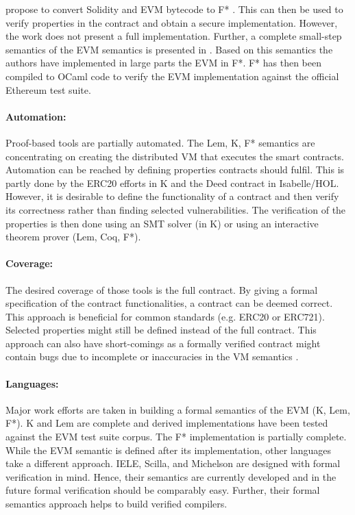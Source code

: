 \citeauthor{Bhargavan2016} propose to convert Solidity and EVM bytecode to F* \cite{Bhargavan2016}. This can then be used to verify properties in the contract and obtain a secure implementation. However, the work does not present a full implementation.
Further, a complete small-step semantics of the EVM semantics is presented in \cite{Grishchenko2018}. Based on this semantics the authors have implemented in large parts the EVM in F*. F* has then been compiled to OCaml code to verify the EVM implementation against the official Ethereum test suite.

\paragraph{Automation:} Proof-based tools are partially automated. The Lem, K, F* semantics are concentrating on creating the distributed VM that executes the smart contracts. Automation can be reached by defining properties contracts should fulfil. This is partly done by the ERC20 efforts in K and the Deed contract in Isabelle/HOL. However, it is desirable to define the functionality of a contract and then verify its correctness rather than finding selected vulnerabilities. The verification of the properties is then done using an SMT solver (in K) or using an interactive theorem prover (Lem, Coq, F*).

\paragraph{Coverage:} The desired coverage of those tools is the full contract. By giving a formal specification of the contract functionalities, a contract can be deemed correct. This approach is beneficial for common standards (e.g. ERC20 or ERC721). Selected properties might still be defined instead of the full contract. This approach can also have short-comings as a formally verified contract might contain bugs due to incomplete or inaccuracies in the VM semantics \cite{Hirai2016}.

\paragraph{Languages:} Major work efforts are taken in building a formal semantics of the EVM (K, Lem, F*). K and Lem are complete and derived implementations have been tested against the EVM test suite corpus. The F* implementation is partially complete. While the EVM semantic is defined after its implementation, other languages take a different approach. IELE, Scilla, and Michelson are designed with formal verification in mind. Hence, their semantics are currently developed and in the future formal verification should be comparably easy. Further, their formal semantics approach helps to build verified compilers.

